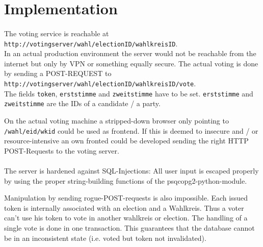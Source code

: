 \documentclass[10pt,a4paper]{article}
\begin{document}
\section*{Implementation}

\paragraph*{}
The voting service is reachable at \\
\texttt{http://votingserver/wahl/electionID/wahlkreisID}. \\
In an actual production environment the server would not be reachable from the internet but only by VPN or something equally secure. The actual voting is done by sending a POST-REQUEST to \\ \texttt{http://votingserver/wahl/electionID/wahlkreisID/vote}. \\
The fields \texttt{token}, \texttt{erststimme} and \texttt{zweitstimme} have to be set. \texttt{erststimme} and \texttt{zweitstimme} are the IDs of a candidate / a party. 

On the actual voting machine a stripped-down browser only pointing to \texttt{/wahl/eid/wkid} could be used as frontend. If this is deemed to insecure and / or resource-intensive an own fronted could be developed sending the right HTTP POST-Requests to the voting server.

\paragraph*{}
The server is hardened against SQL-Injections: All user input is escaped properly by using the proper string-building functions of the psqcopg2-python-module.

Manipulation by sending rogue-POST-requests is also impossible. Each issued token is internally associated with an election and a Wahlkreis. Thus a voter can't use his token to vote in another wahlkreis or election. The handling of a single vote is done in one transaction. This guarantees that the database cannot be in an inconsistent state (i.e. voted but token not invalidated).
\end{document}
